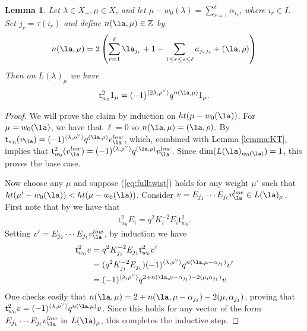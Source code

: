 \documentclass[11pt,reqno]{amsart}
\numberwithin{equation}{section}
\newtheorem{Lemma}[equation]{Lemma}
\theoremstyle{definition}
\theoremstyle{named}
\newcommand{\st}{\mathsf{t}}
\newcommand{\ZZ}{\mathbb{Z}}
\newcommand{\sone}{\mathsf{1}}
\begin{document}
\begin{Lemma}\label{lem:fulltwist}
Let $\lambda\in X_+, \mu \in X$, and let $\mu-w_0(\lambda)=\sum_{r=1}^\ell \alpha_{i_r}$, where $i_r\in I$.  Set $j_r=\tau(i_r)$ and 
define $n(\la,\mu)\in\ZZ$ by 
    $$
    n(\la,\mu)=2\left(\sum_{r=1}^\ell \la_{j_r}+1-\sum_{1\leq r\leq s\leq \ell}a_{j_rj_s}+(\la,\rho)\right)
    $$
    Then on  $L(\lambda)_\mu$ we have \begin{align}\label{eq:fulltwist}\st^2_{w_0}\sone_\mu=(-1)^{\langle 2\lambda ,\rho^\vee \rangle}q^{n(\la,\mu)}\sone_\mu.\end{align}
\end{Lemma}

\begin{proof}
We will prove the  claim by induction on $ht(\mu-w_0(\la))$.  For $\mu=w_0(\la)$, we have that $\ell=0$ so  $n(\la,\mu)=(\la,\rho)$.  By \cite[Equation (7)]{KT}  $\st_{w_0}(v_\la)=(-1)^{\langle \lambda ,\rho^\vee \rangle}q^{(\la,\rho)}v_\la^{low}$, which, combined with Lemma \ref{lemma:KT}, implies that $\st_{w_0}^2(v_\la^{low})=(-1)^{\langle \lambda ,\rho^\vee \rangle}q^{(\la,\rho)}v_\la^{low}$.  Since $\dim(L(\la)_{w_0(\la)})=1$, this proves the base case.  

Now choose any $\mu$ and suppose (\ref{eq:fulltwist}) holds for any weight $\mu'$ such that $ht(\mu'-w_0(\la))<ht(\mu-w_0(\la))$.  Consider  $v=E_{j_1}\cdots  E_{j_\ell}v_\la^{low} \in L(\la)_\mu$.  First note that by \cite[Lemma 5.4]{KT} we have that
\begin{align}\label{lem:ftcomm}
\st_{w_0}^2E_i=q^2K_i^{-2}E_i\st_{w_0}^2.
\end{align}
Setting $v'=E_{j_2}\cdots  E_{j_\ell}v_\la^{low}$, by induction we have
\begin{align*}
\st_{w_0}^2v &= q^2K_{j_1}^{-2}E_{j_1}\st_{w_0}^2v' \\
&= (q^2K_{j_1}^{-2}E_{j_1})(-1)^{\langle \lambda ,\rho^\vee \rangle}q^{n(\la,\mu-\alpha_{j_1})}v' \\
&= (-1)^{\langle \lambda ,\rho^\vee \rangle}q^{2+n(\la,\mu-\alpha_{j_1})-2(\mu,\alpha_{j_1})}v
\end{align*}
One checks easily that $n(\la,\mu)=2+n(\la,\mu-\alpha_{j_1})-2(\mu,\alpha_{j_1})$, proving that $\st_{w_0}^2v=(-1)^{\langle \lambda ,\rho^\vee \rangle}q^{n(\la,\mu)}v$.  Since this holds for any vector of the form $E_{j_1}\cdots  E_{j_\ell}v_\la^{low}$ in $L(\la)_\mu$, this completes the inductive step.
\end{proof}
\end{document}
